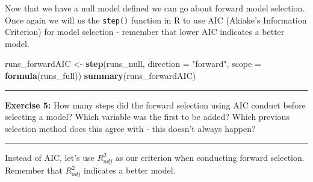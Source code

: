 \documentclass[]{book}
\newenvironment{Shaded}{\begin{snugshade}}{\end{snugshade}}
\newcommand{\KeywordTok}[1]{\textcolor[rgb]{0.13,0.29,0.53}{\textbf{{#1}}}}
\newcommand{\DataTypeTok}[1]{\textcolor[rgb]{0.13,0.29,0.53}{{#1}}}
\newcommand{\DecValTok}[1]{\textcolor[rgb]{0.00,0.00,0.81}{{#1}}}
\newcommand{\StringTok}[1]{\textcolor[rgb]{0.31,0.60,0.02}{{#1}}}
\newcommand{\NormalTok}[1]{{#1}}
\theoremstyle{definition}
\theoremstyle{definition}
\theoremstyle{definition}
\theoremstyle{remark}
\begin{document}
Now that we have a null model defined we can go about forward model
selection. Once again we will us the \texttt{step()} function in R to
use AIC (Akiake's Information Criterion) for model selection - remember
that lower AIC indicates a better model.

\begin{Shaded}
\begin{Highlighting}[]
\NormalTok{runs_forwardAIC <-}\StringTok{ }\KeywordTok{step}\NormalTok{(runs_null, }\DataTypeTok{direction =} \StringTok{"forward"}\NormalTok{, }\DataTypeTok{scope =} \KeywordTok{formula}\NormalTok{(runs_full))}
\KeywordTok{summary}\NormalTok{(runs_forwardAIC)}
\end{Highlighting}
\end{Shaded}

\begin{center}\rule{0.5\linewidth}{\linethickness}\end{center}

\textbf{Exercise 5:} How many steps did the forward selection using AIC
conduct before selecting a model? Which variable was the first to be
added? Which previous selection method does this agree with - this
doesn't always happen?

\begin{center}\rule{0.5\linewidth}{\linethickness}\end{center}

Instead of AIC, let's use \(R^2_{adj}\) as our criterion when conducting
forward selection. Remember that \(R^2_{adj}\) indicates a better model.

\begin{Shaded}
\end{Shaded}
\end{document}
